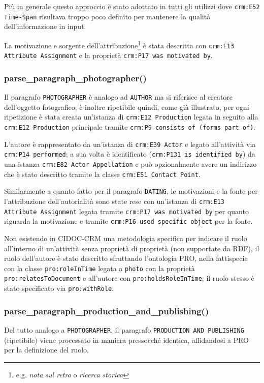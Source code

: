 Più in generale questo approccio è stato adottato in tutti gli utilizzi dove \texttt{crm:E52 Time-Span} risultava troppo poco definito per mantenere la qualità dell'informazione in input.

La motivazione e sorgente dell'attribuzione\footnote{e.g. \emph{nota sul retro} o \emph{ricerca storica}} è stata descritta con \texttt{crm:E13 Attribute Assignment} e la proprietà \texttt{crm:P17 was motivated by}.

\subsubsection{parse\_paragraph\_photographer()}
Il paragrafo \texttt{PHOTOGRAPHER} è analogo ad \texttt{AUTHOR} ma si riferisce al creatore dell'oggetto fotografico; è inoltre ripetibile quindi, come già illustrato, per ogni ripetizione è stata creata un'istanza di \texttt{crm:E12 Production} legata in seguito alla \texttt{crm:E12 Production} principale tramite \texttt{crm:P9 consists of (forms part of)}.

L'autore è rappresentato da un'istanza di \texttt{crm:E39 Actor} e legato all'attività via \texttt{crm:P14 performed}; a sua volta è identificato (\texttt{crm:P131 is identified by}) da una istanza \texttt{crm:E82 Actor Appellation} e può opzionalmente avere un indirizzo che è stato descritto tramite la classe \texttt{crm:E51 Contact Point}.

Similarmente a quanto fatto per il paragrafo \texttt{DATING}, le motivazioni e la fonte per l'attribuzione dell'autorialità sono state rese con un'istanza di \texttt{crm:E13 Attribute Assignment} legata tramite \texttt{crm:P17 was motivated by} per quanto riguarda la motivazione e tramite \texttt{crm:P16 used specific object} per la fonte.

Non esistendo in CIDOC-CRM una metodologia specifica per indicare il ruolo all'interno di un'attività senza proprietà di proprietà (non supportate da RDF), il ruolo dell'autore è stato descritto sfruttando l'ontologia PRO, nella fattispecie con la classe \texttt{pro:roleInTime} legata a \texttt{photo} con la proprietà \texttt{pro:relatesToDocument} e all'autore con \texttt{pro:holdsRoleInTime}; il ruolo stesso è stato specificato via \texttt{pro:withRole}.

\subsubsection{parse\_paragraph\_production\_and\_publishing()}
Del tutto analogo a \texttt{PHOTOGRAPHER}, il paragrafo \texttt{PRODUCTION AND PUBLISHING} (ripetibile) viene processato in maniera pressocché identica, affidandosi a PRO per la definizione del ruolo.

